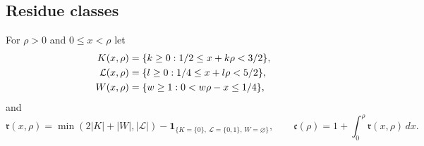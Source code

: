 \documentclass{amsart}
\numberwithin{equation}{section}
\numberwithin{table}{section}
\begin{document}
\subsection{Residue classes}
For $\rho>0$ and $0\le x<\rho$ let
\begin{align}\label{eq:residue-sets}
 K(x,\rho)&=\{k\ge0:1/2\le x+k\rho<3/2\},\\
 \mathcal L(x,\rho)&=\{l\ge0:1/4\le x+l\rho<5/2\},\notag
\\
 W(x,\rho)&=\{w\ge1:0<w\rho-x\le1/4\},\notag
\end{align}
and
\begin{equation}\label{eq:residue-rank}
 \mathfrak r(x,\rho)=\min(2|K|+|W|,|\mathcal L|)
       -\mathbf1_{\{K=\{0\},\,\mathcal L=\{0,1\},\,W=\varnothing\}},
 \qquad \mathfrak c(\rho)=1+\int_0^\rho \mathfrak r(x,\rho)\,dx.
\end{equation}
\end{document}
